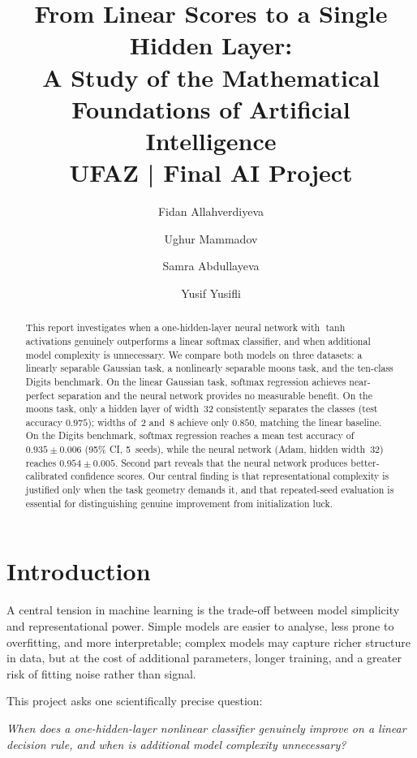 \documentclass[11pt]{article}
\title{\textbf{From Linear Scores to a Single Hidden Layer:}\\[4pt]
       \large A Study of the Mathematical Foundations of Artificial Intelligence\\[8pt]
       \normalsize UFAZ |
       Final AI Project}
\author{Fidan Allahverdiyeva \and Ughur Mammadov \and
        Samra Abdullayeva \and Yusif Yusifli}
\date{}
\begin{document}
\maketitle
\thispagestyle{empty}

\begin{abstract}
This report investigates when a one-hidden-layer neural network with $\tanh$
activations genuinely outperforms a linear softmax classifier, and when
additional model complexity is unnecessary.
We compare both models on three datasets: a linearly separable Gaussian task,
a nonlinearly separable moons task, and the ten-class Digits benchmark.
On the linear Gaussian task, softmax regression achieves near-perfect separation
and the neural network provides no measurable benefit.
On the moons task, only a hidden layer of width~32 consistently separates the
classes (test accuracy $0.975$); widths of~2 and~8 achieve only $0.850$,
matching the linear baseline.
On the Digits benchmark, softmax regression reaches a mean test accuracy of
$0.935\pm0.006$ (95\% CI, 5~seeds), while the neural network (Adam, hidden
width~32) reaches $0.954\pm0.005$.
Second part reveals that the neural network produces better-calibrated
confidence scores.
Our central finding is that representational complexity is justified only when
the task geometry demands it, and that repeated-seed evaluation is essential
for distinguishing genuine improvement from initialization luck.
\end{abstract}

\tableofcontents
\newpage

\section{Introduction}
\label{sec:intro}

A central tension in machine learning is the trade-off between model simplicity
and representational power.
Simple models are easier to analyse, less prone to overfitting, and more
interpretable; complex models may capture richer structure in data, but at the
cost of additional parameters, longer training, and a greater risk of fitting
noise rather than signal.

This project asks one scientifically precise question:
\begin{center}
\itshape
When does a one-hidden-layer nonlinear classifier genuinely improve on a linear
decision rule, and when is additional model complexity unnecessary?
\end{center}
\end{document}
